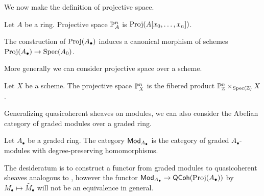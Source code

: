 We now make the definition of projective space. 
\begin{definition}\label{def: projective space}
    Let $A$ be a ring. Projective space $\mathbb{P}^{n}_{A}$ is $\operatorname{Proj}(A[x_{0},\dots,x_{n}])$. 
\end{definition}
\begin{remark}\label{rmk: canonical map to A0}
    The construction of $\operatorname{Proj}(A_{\bullet})$ induces a canonical morphism of schemes $\operatorname{Proj}(A_{\bullet})\to\operatorname{Spec}(A_{0})$. 
\end{remark}
More generally we can consider projective space over a scheme. 
\begin{definition}\label{def: projective space over scheme}
    Let $X$ be a scheme. The projective space $\mathbb{P}^{n}_{X}$ is the fibered product $\mathbb{P}^{n}_{\mathbb{Z}}\times_{\operatorname{Spec}(\mathbb{Z})}X$. 
\end{definition}
Generalizing quasicoherent sheaves on modules, we can also consider the Abelian category of graded modules over a graded ring. 
\begin{definition}\label{def: graded modules}
    Let $A_{\bullet}$ be a graded ring. The category $\mathsf{Mod}_{A_{\bullet}}$ is the category of graded $A_{\bullet}$-modules with degree-preserving homomorphisms. 
\end{definition}
The desideratum is to construct a functor from graded modules to quasicoherent sheaves analogous to , however the functor $\mathsf{Mod}_{A_{\bullet}}\to\mathsf{QCoh}(\operatorname{Proj}(A_{\bullet}))$ by $M_{\bullet}\mapsto\widetilde{M_{\bullet}}$ will not be an equivalence in general. 


